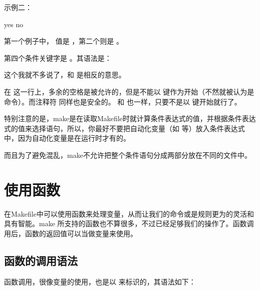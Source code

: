 \documentclass[a4paper,10pt]{sphinxmanual}
\begin{document}
示例二：

\begin{sphinxVerbatim}[commandchars=\\\{\}]
 
      yes
      no
\end{sphinxVerbatim}

第一个例子中，  值是  ，第二个则是 。

第四个条件关键字是  。其语法是：

\begin{sphinxVerbatim}[commandchars=\\\{\}]
\end{sphinxVerbatim}

这个我就不多说了，和  是相反的意思。

在  这一行上，多余的空格是被允许的，但是不能以  键作为开始（不然就被认为是命令）。而注释符 \sphinxcode{\sphinxupquote{\#}} 同样也是安全的。  和 
也一样，只要不是以  键开始就行了。

特别注意的是，make是在读取Makefile时就计算条件表达式的值，并根据条件表达式的值来选择语句，所以，你最好不要把自动化变量（如  等）放入条件表达式中，因为自动化变量是在运行时才有的。

而且为了避免混乱，make不允许把整个条件语句分成两部分放在不同的文件中。


\chapter{使用函数}
\label{\detokenize{functions:id1}}\label{\detokenize{functions::doc}}
在Makefile中可以使用函数来处理变量，从而让我们的命令或是规则更为的灵活和具有智能。make
所支持的函数也不算很多，不过已经足够我们的操作了。函数调用后，函数的返回值可以当做变量来使用。


\section{函数的调用语法}
\label{\detokenize{functions:id2}}
函数调用，很像变量的使用，也是以 \sphinxcode{\sphinxupquote{\$}} 来标识的，其语法如下：
\end{document}
